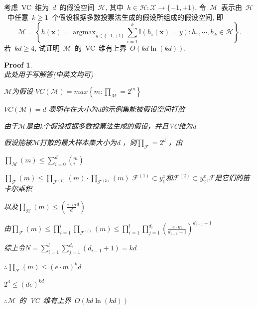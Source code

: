 \documentclass[a4paper,UTF8]{article}
\numberwithin{equation}{section}
\newtheorem*{myProof}{Proof}
\begin{document}
\noindent 考虑~VC~维为~$d$~的假设空间~$\mathcal{H}$, 其中~$h \in \mathcal{H} : \mathcal{X} \rightarrow \{ -1 , +1 \} $, 令~$\mathcal{M}$~表示由~$\mathcal{H}$~中任意~$k \geqslant 1$~个假设根据多数投票法生成的假设所组成的假设空间, 即
\begin{equation}
    \mathcal{M} 
    = \left\{ h(\bm{x}) = \mathop{\arg \max}_{ y \in \{ -1 , +1 \} } \sum_{i=1}^k \mathbb{I} ( h_i(\bm{x}) = y) : h_1 , \cdots , h_k \in \mathcal{H} \right\} . 
\end{equation}
若~$kd \geqslant 4$, 试证明~$\mathcal{M}$~的~VC~维有上界~$ O ( kd \ln(kd) )$. 

\begin{myProof}~\\ 
    此处用于写解答(中英文均可)
    
    
    
    $\mathcal{M}$为假设
    $VC\left ( \mathcal{M}  \right ) = max\left\{ m: \prod _\mathcal{M} = 2^m\right\}$
    
    $VC\left ( \mathcal{M}  \right ) = d$ 表明存在大小为d的示例集能被假设空间打散
    
    由于$\mathcal{M} $是由k个假设根据多数投票法生成的假设，并且VC维为d
    
    假设能被$\mathcal{M} $打散的最大样本集大小为d ，则$\prod_{\mathcal{F}} = 2^d$ ，由
    
    $\prod_{\mathcal{M}}\left ( m \right )\leq \sum_{i=0}^{d}\left ( _{i}^{m}\textrm{} \right )$
    
    $\prod_{\mathcal{F}}\left ( m \right ) \leq \prod_{\mathcal{F}^{\left ( 1 \right )}}\left ( m \right )\cdot \prod_{\mathcal{F}^{\left ( 2 \right )}}\left ( m \right )$ 
    $\mathcal{F}^{\left ( 1 \right )}\subset y_{1}^{x}$和$\mathcal{F}^{\left ( 2 \right )}\subset y_{2}^{x}$,$\mathcal{F}$是它们的笛卡尔乘积
    
    以及$\prod_{\mathcal{H}}\left ( m \right )\leq \left ( {\frac{e\cdot m}{d}}^d \right )$
    
    由$\prod_{\mathcal{F}}\left ( m \right )\leq \prod_{i=1}^{l}\prod_{\mathcal{F}^{\left ( i \right )}}\left ( m \right )\leq \prod_{i=1}^{l}\prod_{j=1}^{d_i}\left ( \frac{e\cdot m}{d_{i-1}+1} \right )^{d_{i-1}+1}$
    
    综上令$N=\sum_{i=1}^{l}\sum_{j=1}^{d_i}\left ( d_{i-1}+1 \right ) = kd $
    
    $\therefore \prod_{\mathcal{F}}\left ( m \right )\leq \left ( e\cdot m \right )^kd$
    
    $2^d\leq \left ( de \right )^{kd}$
    
    $\therefore \mathcal{M}$~的~VC~维有上界~$ O ( kd \ln(kd) )$
    
    
    
    
\end{myProof}
\end{document}
